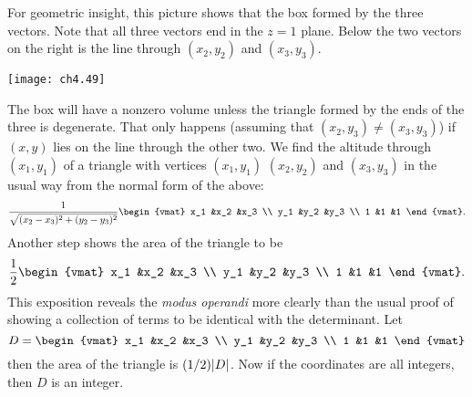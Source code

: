 \begin{exercises}
\begin{answer}
\begin{exparts}
        For geometric insight, this 
        picture shows that the box formed by the three vectors.
        Note that all 
        three vectors end in the $z=1$ plane.
        Below the two vectors on the right is the line through
        $(x_2,y_2)$ and $(x_3,y_3)$.
        \begin{center}
          \texttt{[image: ch4.49]}
        \end{center}
        The box will 
        have a nonzero volume unless the triangle formed by the ends of the
        three is degenerate.
        That only happens (assuming that $(x_2,y_3)\neq (x_3,y_3)$)
        if  $(x,y)$ lies on the line through the other two. 
       \partsitem \answerasgiven %
        We find the altitude through $(x_1,y_1)$ of a triangle with vertices
        $(x_1,y_1)$ $(x_2,y_2)$ and $(x_3,y_3)$ in the usual
        way from the normal form of the above:
        \begin{equation*}
          \frac{1}{\sqrt{(x_2-x_3)^2+(y_2-y_3)^2}}
          \begin{vmat}
            x_1  &x_2  &x_3  \\
            y_1  &y_2  &y_3  \\
            1    &1    &1
          \end{vmat}.
        \end{equation*}
        Another step shows the area of the triangle to be
        \begin{equation*}
          \frac{1}{2}
          \begin{vmat}
            x_1  &x_2  &x_3  \\
            y_1  &y_2  &y_3  \\
            1    &1    &1
          \end{vmat}.
        \end{equation*}
        This exposition reveals the \textit{modus operandi} more clearly
        than the usual proof of showing a collection of terms to be identical
        with the determinant.
       \partsitem  \answerasgiven %
        Let
        \begin{equation*}
          D=
          \begin{vmat}
            x_1  &x_2  &x_3  \\
            y_1  &y_2  &y_3  \\
            1    &1    &1
          \end{vmat}
        \end{equation*}
        then the area of the triangle is $(1/2)\deter{D}$.
        Now if the coordinates are all integers, then $D$ is an integer.
      \end{exparts}
    \end{answer}
\end{exercises}
